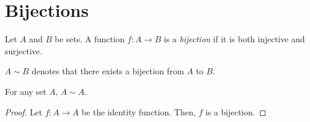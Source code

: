 \section{Bijections} \label{sec:bijections}
\begin{definition}[Bijection]
    Let $A$ and $B$ be sets.
    A function $f : A \to B$ is a \emph{bijection} if it is both injective and
    surjective.
\end{definition}
\begin{notation}
    $A \sim B$ denotes that there exists a bijection from $A$ to $B$.
\end{notation}
\begin{proposition}[Reflexivity] \label{thm:bijections:reflexivity}
    For any set $A$, $A \sim A$.
\end{proposition}
\begin{proof}
    Let $f : A \to A$ be the identity function.
    Then, $f$ is a bijection.
\end{proof}

